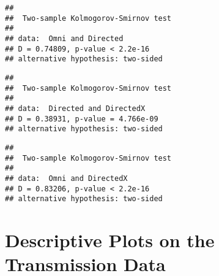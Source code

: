 \begin{verbatim}
## 
##  Two-sample Kolmogorov-Smirnov test
## 
## data:  Omni and Directed
## D = 0.74809, p-value < 2.2e-16
## alternative hypothesis: two-sided
\end{verbatim}

\begin{Shaded}
\begin{Highlighting}[]
 \NormalTok{)}
\end{Highlighting}
\end{Shaded}
% 

\begin{verbatim}
## 
##  Two-sample Kolmogorov-Smirnov test
## 
## data:  Directed and DirectedX
## D = 0.38931, p-value = 4.766e-09
## alternative hypothesis: two-sided
\end{verbatim}

\begin{Shaded}
\begin{Highlighting}[]
 \NormalTok{)}
\end{Highlighting}
\end{Shaded}
% 

\begin{verbatim}
## 
##  Two-sample Kolmogorov-Smirnov test
## 
## data:  Omni and DirectedX
## D = 0.83206, p-value < 2.2e-16
## alternative hypothesis: two-sided
\end{verbatim}

\pagebreak


\section{Descriptive Plots on the Transmission Data}\label{plot-trans}



% 

